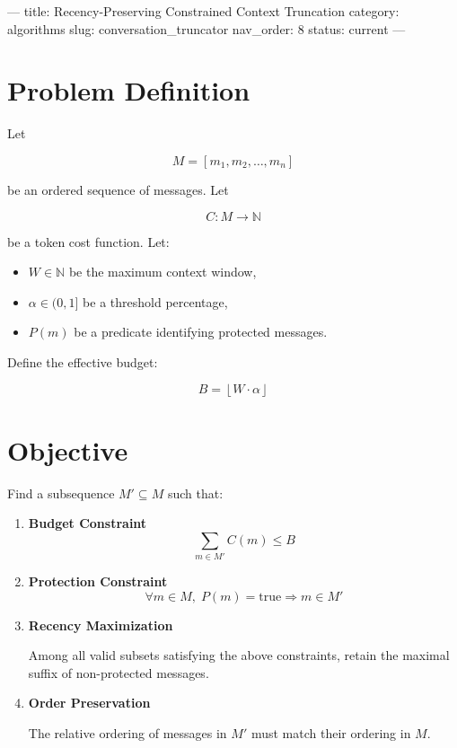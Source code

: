 ---
title: Recency-Preserving Constrained Context Truncation
category: algorithms
slug: conversation_truncator
nav_order: 8
status: current
---

\section{Problem Definition}

Let

\[ M = [m_1, m_2, \dots, m_n] \]

be an ordered sequence of messages. Let

\[ C : M \rightarrow \mathbb{N} \]

be a token cost function. Let:

\begin{itemize}
  \item $W \in \mathbb{N}$ be the maximum context window,
  \item $\alpha \in (0,1]$ be a threshold percentage,
  \item $P(m)$ be a predicate identifying protected messages.
\end{itemize}

Define the effective budget:

\[ B = \left\lfloor W \cdot \alpha \right\rfloor \]

\section{Objective}

Find a subsequence $M' \subseteq M$ such that:

\begin{enumerate}
  \item \textbf{Budget Constraint}
  \[ \sum_{m \in M'} C(m) \leq B \]

  \item \textbf{Protection Constraint}
  \[ \forall m \in M, \; P(m) = \text{true} \Rightarrow m \in M' \]

  \item \textbf{Recency Maximization}

  Among all valid subsets satisfying the above constraints, retain
  the maximal suffix of non-protected messages.

  \item \textbf{Order Preservation}

  The relative ordering of messages in $M'$ must match their ordering in $M$.
\end{enumerate}

